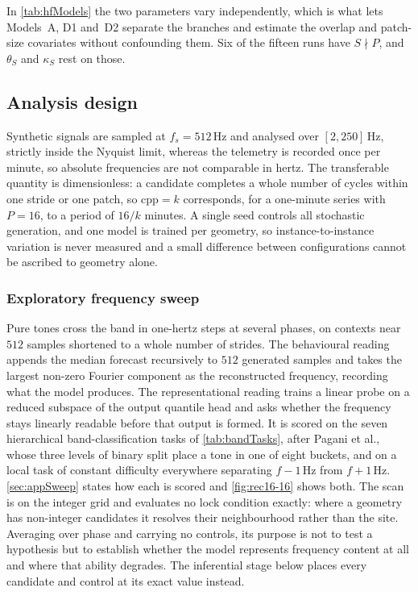 In \autoref{tab:hfModels} the two parameters vary independently, which is what lets Models~A, D1 and~D2 separate the branches and estimate the overlap and patch-size covariates without confounding them. Six of the fifteen runs have $S \nmid P$, and $\theta_S$ and $\kappa_S$ rest on those.

\subsection{Analysis design}

Synthetic signals are sampled at $f_s=512$\,Hz and analysed over $[2,250]$\,Hz, strictly inside the Nyquist limit, whereas the telemetry is recorded once per minute, so absolute frequencies are not comparable in hertz. The transferable quantity is dimensionless: a candidate completes a whole number of cycles within one stride or one patch, so $\mathrm{cpp}=k$ corresponds, for a one-minute series with $P=16$, to a period of $16/k$ minutes. A single seed controls all stochastic generation, and one model is trained per geometry, so instance-to-instance variation is never measured and a small difference between configurations cannot be ascribed to geometry alone.

\subsubsection{Exploratory frequency sweep}

Pure tones cross the band in one-hertz steps at several phases, on contexts near $512$ samples shortened to a whole number of strides. The behavioural reading appends the median forecast recursively to $512$ generated samples and takes the largest non-zero Fourier component as the reconstructed frequency, recording what the model produces. The representational reading trains a linear probe on a reduced subspace of the output quantile head and asks whether the frequency stays linearly readable before that output is formed. It is scored on the seven hierarchical band-classification tasks of \autoref{tab:bandTasks}, after Pagani et al.\autocite{paganiPreliminaryInsightsChronos2026}, whose three levels of binary split place a tone in one of eight buckets, and on a local task of constant difficulty everywhere separating $f-1$\,Hz from $f+1$\,Hz. \autoref{sec:appSweep} states how each is scored and \autoref{fig:rec16-16} shows both. The scan is on the integer grid and evaluates no lock condition exactly: where a geometry has non-integer candidates it resolves their neighbourhood rather than the site. Averaging over phase and carrying no controls, its purpose is not to test a hypothesis but to establish whether the model represents frequency content at all and where that ability degrades. The inferential stage below places every candidate and control at its exact value instead.

